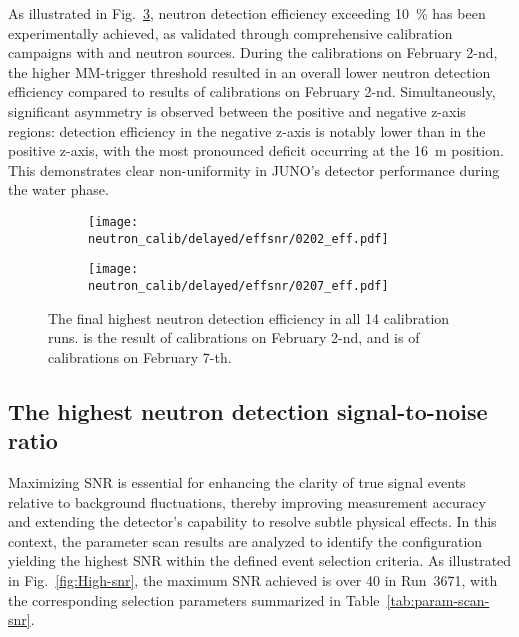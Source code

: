 As illustrated in Fig.~\ref{fig:SummaryEff}, neutron detection efficiency exceeding \SI{10}{\%} has been experimentally achieved, as validated through comprehensive calibration campaigns with  and  neutron sources. During the calibrations on February 2-nd, the higher MM-trigger threshold resulted in an overall lower neutron detection efficiency compared to results of calibrations on February 2-nd. Simultaneously, significant asymmetry is observed between the positive and negative z-axis regions: detection efficiency in the negative z-axis is notably lower than in the positive z-axis, with the most pronounced deficit occurring at the \SI{16}{m} position. This demonstrates clear non-uniformity in JUNO's detector performance during the water phase.
\begin{figure}[h]
	\begin{subfigure}{0.5\textwidth}
		\centering
		\texttt{[image: neutron\_calib/delayed/effsnr/0202\_eff.pdf]}
		\caption{}
		\label{fig:SummaryEff0202}
	\end{subfigure}%
	\begin{subfigure}{0.5\textwidth}
		\centering
		\texttt{[image: neutron\_calib/delayed/effsnr/0207\_eff.pdf]}
		\caption{}
		\label{fig:SummaryEff0207}
	\end{subfigure}
	\caption{The final highest neutron detection efficiency in all 14 calibration runs.  is the result of calibrations on February 2-nd, and  is of calibrations on February 7-th. }
	\label{fig:SummaryEff}
\end{figure}

\subsection{The highest neutron detection signal-to-noise ratio}
Maximizing SNR is essential for enhancing the clarity of true signal events relative to background fluctuations, thereby improving measurement accuracy and extending the detector's capability to resolve subtle physical effects. In this context, the parameter scan results are analyzed to identify the configuration yielding the highest SNR within the defined event selection criteria. As illustrated in Fig.~\ref{fig:High-snr}, the maximum SNR achieved is over 40 in Run~3671, with the corresponding selection parameters summarized in Table~\ref{tab:param-scan-snr}.

